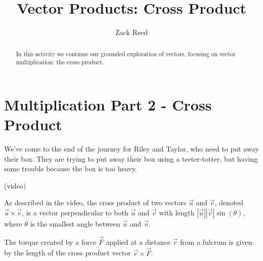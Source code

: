 \documentclass{ximera}
\title{Vector Products: Cross Product}
\author{Zack Reed}
\begin{document}
\begin{abstract}
In this activity we continue our grounded exploration of vectors, focusing on vector multiplication: the cross product.
\end{abstract}
\maketitle

\section{Multiplication Part 2 - Cross Product}

We've come to the end of the journey for Riley and Taylor, who need to put away their box. They are trying to put away their box using a teeter-totter, but having some trouble because the box is too heavy. 

(video)

\begin{definition}
    As described in the video, the cross product of two vectors $\vec{u}$ and $\vec{v}$, denoted $\vec{u}\times \vec{v}$, is a vector perpendicular to both $\vec{u}$ and $\vec{v}$ with length $|\vec{u}||\vec{v}|\sin(\theta)$, where $\theta$ is the smallest angle between $\vec{u}$ and $\vec{v}$.
\end{definition}

\begin{definition}
    The torque created by a force $\vec{F}$ applied at a distance $\vec{r}$ from a fulcrum is given by the length of the cross product vector $\vec{r}\times \vec{F}$.
\end{definition}
\end{document}
